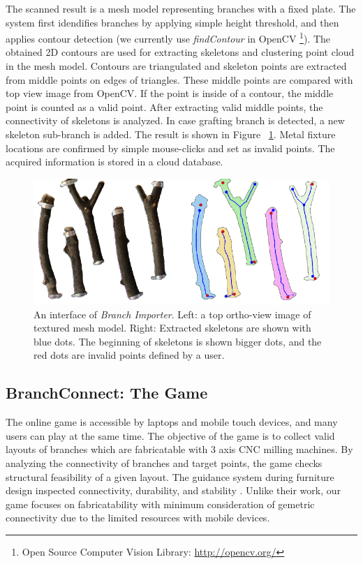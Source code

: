 The scanned result is a mesh model representing branches with a fixed plate.
The system first idendifies branches by applying simple height threshold, and then applies contour detection (we currently use \textit{findContour} in OpenCV \footnote{Open Source Computer Vision Library: \url{http://opencv.org/} }).
The obtained 2D contours are used for extracting skeletons and clustering point cloud in the mesh model.
Contours are triangulated and skeleton points are extracted from middle points on edges of triangles.
These middle points are compared with top view image from OpenCV.
If the point is inside of a contour, the middle point is counted as a valid point.
After extracting valid middle points, the connectivity of skeletons is analyzed. 
In case grafting branch is detected, a new skeleton sub-branch is added. 
The result is shown in Figure ~\ref{fig:skeleton}.
Metal fixture locations are confirmed by simple mouse-clicks and set as invalid points.
The acquired information is stored in a cloud database.

\begin{figure}[ht]
  \includegraphics[width = 0.4\paperwidth]{images/importer/importer.png}
  \caption{An interface of \textit{Branch Importer}. Left: a top ortho-view image of textured mesh model. Right: Extracted skeletons are shown with blue dots. The beginning of skeletons is shown bigger dots, and the red dots are invalid points defined by a user. }
  \label{fig:skeleton}
\end{figure}


\subsection{BranchConnect: The Game}
The online game is accessible by laptops and mobile touch devices, and many users can play at the same time.
The objective of the game is to collect valid layouts of branches which are fabricatable with 3 axis CNC milling machines.
By analyzing the connectivity of branches and target points, the game checks structural feasibility of a given layout. 
The guidance system during furniture design inspected connectivity, durability, and stability \cite{umetani2012guided}. 
Unlike their work, our game focuses on fabricatability with minimum consideration of gemetric connectivity due to the limited resources with mobile devices.


